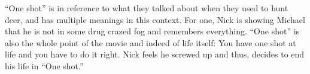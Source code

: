 \documentclass[notitlepage]{fhnwreport}
\begin{document}
``One shot'' is in reference to what they talked about when they used to hunt deer, and has multiple meanings in this context. For one, Nick is showing Michael that he is not in some drug crazed fog and remembers everything. ``One shot'' is also the whole point of the movie and indeed of life itself: You have one shot at life and you have to do it right. Nick feels he screwed up and thus, decides to end his life in ``One shot.''

\printbibliography
\end{document}
